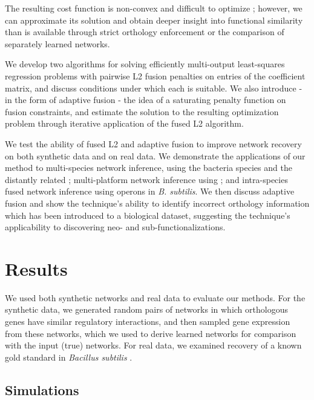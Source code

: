 \documentclass[11pt]{article}
\begin{document}
The resulting cost function is non-convex and difficult to optimize \cite{fan2001variable}; however, we can approximate its solution and obtain deeper insight into functional similarity than is available through strict orthology enforcement or the comparison of separately learned networks. 

We develop two algorithms for solving efficiently multi-output least-squares regression problems with pairwise L2 fusion penalties on entries of the coefficient matrix, and discuss conditions under which each is suitable. We also introduce - in the form of adaptive fusion - the idea of a saturating penalty function on fusion constraints, and estimate the solution to the resulting optimization problem through iterative application of the fused L2 algorithm.

We test the ability of fused L2 and adaptive fusion to improve network recovery on both synthetic data and on real data. We demonstrate the applications of our method to multi-species network inference, using the bacteria species  and the distantly related ; multi-platform network inference using ; and intra-species fused network inference using operons in \textit{B. subtilis}. We then discuss adaptive fusion and show the technique's ability to identify incorrect orthology information which has been introduced to a biological dataset, suggesting the technique's applicability to discovering neo- and sub-functionalizations. 


\section{Results}
We used both synthetic networks and real data to evaluate our methods. For the synthetic data, we generated random pairs of networks in which orthologous genes have similar regulatory interactions, and then sampled gene expression from these networks, which we used to derive learned networks for comparison with the input (true) networks. For real data, we examined recovery of a known gold standard in \textit{Bacillus subtilis} \cite{michna_subtiwikidatabase_2014}. 

\subsection{Simulations}
\end{document}
